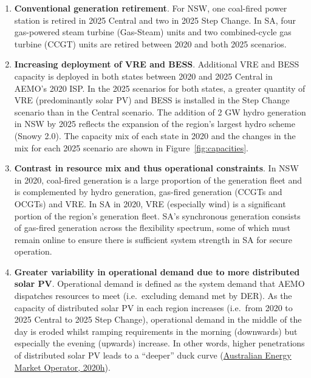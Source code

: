 \documentclass[12pt,a4paper,]{report}
\providecommand{\tightlist}{%
  \setlength{\itemsep}{0pt}\setlength{\parskip}{0pt}}
\begin{document}
\begin{enumerate}
\def\labelenumi{\arabic{enumi}.}
\tightlist
\item
  \textbf{Conventional generation retirement}. For NSW, one coal-fired
  power station is retired in 2025 Central and two in 2025 Step Change.
  In SA, four gas-powered steam turbine (Gas-Steam) units and two
  combined-cycle gas turbine (CCGT) units are retired between 2020 and
  both 2025 scenarios.
\item
  \textbf{Increasing deployment of VRE and BESS}. Additional VRE and
  BESS capacity is deployed in both states between 2020 and 2025 Central
  in AEMO's 2020 ISP. In the 2025 scenarios for both states, a greater
  quantity of VRE (predominantly solar PV) and BESS is installed in the
  Step Change scenario than in the Central scenario. The addition of 2
  GW hydro generation in NSW by 2025 reflects the expansion of the
  region's largest hydro scheme (Snowy 2.0). The capacity mix of each
  state in 2020 and the changes in the mix for each 2025 scenario are
  shown in Figure~\ref{fig:capacities}.
\item
  \textbf{Contrast in resource mix and thus operational constraints}. In
  NSW in 2020, coal-fired generation is a large proportion of the
  generation fleet and is complemented by hydro generation, gas-fired
  generation (CCGTs and OCGTs) and VRE. In SA in 2020, VRE (especially
  wind) is a significant portion of the region's generation fleet. SA's
  synchronous generation consists of gas-fired generation across the
  flexibility spectrum, some of which must remain online to ensure there
  is sufficient system strength in SA for secure operation.
\item
  \textbf{Greater variability in operational demand due to more
  distributed solar PV}. Operational demand is defined as the system
  demand that AEMO dispatches resources to meet (i.e.~excluding demand
  met by DER). As the capacity of distributed solar PV in each region
  increases (i.e.~from 2020 to 2025 Central to 2025 Step Change),
  operational demand in the middle of the day is eroded whilst ramping
  requirements in the morning (downwards) but especially the evening
  (upwards) increase. In other words, higher penetrations of distributed
  solar PV leads to a ``deeper'' duck curve
  (\protect\hyperlink{ref-australianenergymarketoperatorRenewableIntegrationStudy2020b}{Australian
  Energy Market Operator, 2020h}).
\end{enumerate}
\end{document}
